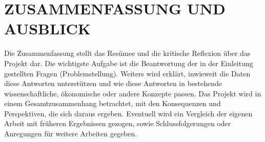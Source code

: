 \documentclass[./\jobname.tex]{subfiles}
\begin{document}
%
\section{ZUSAMMENFASSUNG UND AUSBLICK}\raggedbottom
%
Die Zusammenfassung stellt das Resümee und die kritische Reflexion über das Projekt dar. Die wichtigste Aufgabe ist die Beantwortung der in der Einleitung gestellten Fragen (Problemstellung). Weiters wird erklärt, inwieweit die Daten diese Antworten unterstützen und wie diese Antworten in bestehende wissenschaftliche, ökonomische oder andere  Konzepte passen. Das Projekt wird in einem Gesamtzusammenhang betrachtet, mit den Konsequenzen und Perspektiven, die sich daraus ergeben. Eventuell wird ein Vergleich der eigenen Arbeit mit früheren Ergebnissen gezogen, sowie Schlussfolgerungen oder Anregungen für weitere Arbeiten gegeben.
%
\end{document}
